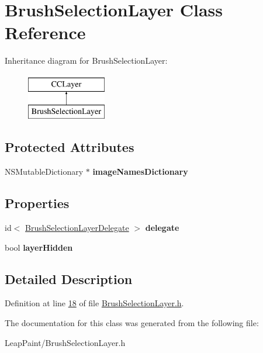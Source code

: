 \hypertarget{interface_brush_selection_layer}{\section{Brush\-Selection\-Layer Class Reference}
\label{d5/d83/interface_brush_selection_layer}
}
Inheritance diagram for Brush\-Selection\-Layer\-:\begin{figure}[H]
\begin{center}
\leavevmode
\includegraphics[height=2.000000cm]{d5/d83/interface_brush_selection_layer}
\end{center}
\end{figure}
\subsection*{Protected Attributes}
\begin{DoxyCompactItemize}
\item 
\hypertarget{interface_brush_selection_layer_a4ec74d274a54411ce95f3168ee5823ba}{N\-S\-Mutable\-Dictionary $\ast$ {\bfseries image\-Names\-Dictionary}}\label{d5/d83/interface_brush_selection_layer_a4ec74d274a54411ce95f3168ee5823ba}

\end{DoxyCompactItemize}
\subsection*{Properties}
\begin{DoxyCompactItemize}
\item 
\hypertarget{interface_brush_selection_layer_a777a4f065988aee06e9a46ccd0ffb10a}{id$<$ \hyperlink{protocol_brush_selection_layer_delegate-p}{Brush\-Selection\-Layer\-Delegate} $>$ {\bfseries delegate}}\label{d5/d83/interface_brush_selection_layer_a777a4f065988aee06e9a46ccd0ffb10a}

\item 
\hypertarget{interface_brush_selection_layer_aaf6677a075014de2c2b0abe254b241a6}{bool {\bfseries layer\-Hidden}}\label{d5/d83/interface_brush_selection_layer_aaf6677a075014de2c2b0abe254b241a6}

\end{DoxyCompactItemize}


\subsection{Detailed Description}


Definition at line \hyperlink{_brush_selection_layer_8h_source_l00018}{18} of file \hyperlink{_brush_selection_layer_8h_source}{Brush\-Selection\-Layer.\-h}.



The documentation for this class was generated from the following file\-:\begin{DoxyCompactItemize}
\item 
Leap\-Paint/Brush\-Selection\-Layer.\-h\end{DoxyCompactItemize}
